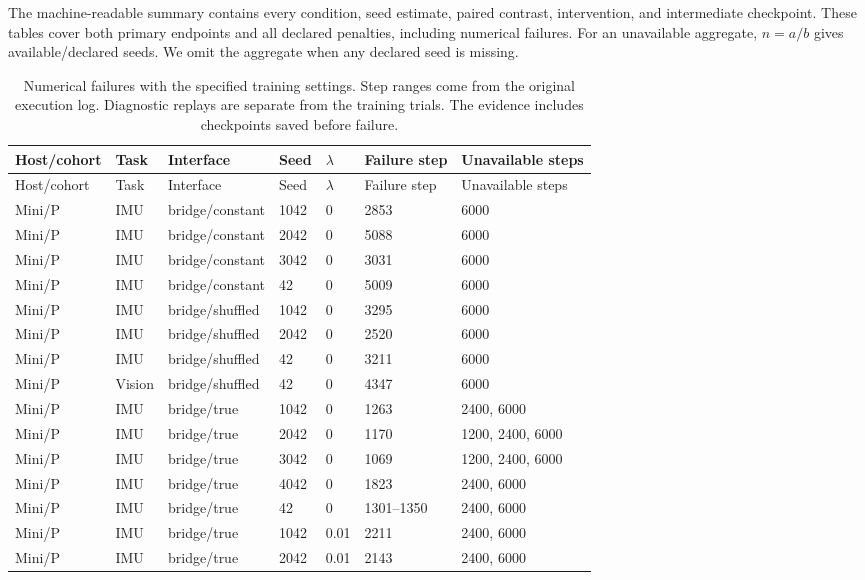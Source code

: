 The machine-readable summary contains every condition, seed estimate, paired contrast, intervention, and intermediate checkpoint. These tables cover both primary endpoints and all declared penalties, including numerical failures. For an unavailable aggregate, $n=a/b$ gives available/declared seeds. We omit the aggregate when any declared seed is missing.

{\small
\setlength{\tabcolsep}{4pt}
\begin{longtable}{@{}lllllll@{}}
\caption{Numerical failures with the specified training settings. Step ranges come from the original execution log. Diagnostic replays are separate from the training trials. The evidence includes checkpoints saved before failure.}\label{tab:numerical-failures}\\
\toprule
Host/cohort & Task & Interface & Seed & $\lambda$ & Failure step & Unavailable steps \\
\midrule\endfirsthead
\toprule
Host/cohort & Task & Interface & Seed & $\lambda$ & Failure step & Unavailable steps \\
\midrule\endhead
Mini/P & IMU & bridge/constant & 1042 & 0 & 2853 & 6000 \\
Mini/P & IMU & bridge/constant & 2042 & 0 & 5088 & 6000 \\
Mini/P & IMU & bridge/constant & 3042 & 0 & 3031 & 6000 \\
Mini/P & IMU & bridge/constant & 42 & 0 & 5009 & 6000 \\
Mini/P & IMU & bridge/shuffled & 1042 & 0 & 3295 & 6000 \\
Mini/P & IMU & bridge/shuffled & 2042 & 0 & 2520 & 6000 \\
Mini/P & IMU & bridge/shuffled & 42 & 0 & 3211 & 6000 \\
Mini/P & Vision & bridge/shuffled & 42 & 0 & 4347 & 6000 \\
Mini/P & IMU & bridge/true & 1042 & 0 & 1263 & 2400, 6000 \\
Mini/P & IMU & bridge/true & 2042 & 0 & 1170 & 1200, 2400, 6000 \\
Mini/P & IMU & bridge/true & 3042 & 0 & 1069 & 1200, 2400, 6000 \\
Mini/P & IMU & bridge/true & 4042 & 0 & 1823 & 2400, 6000 \\
Mini/P & IMU & bridge/true & 42 & 0 & 1301--1350 & 2400, 6000 \\
Mini/P & IMU & bridge/true & 1042 & 0.01 & 2211 & 2400, 6000 \\
Mini/P & IMU & bridge/true & 2042 & 0.01 & 2143 & 2400, 6000 \\

\end{longtable}}
